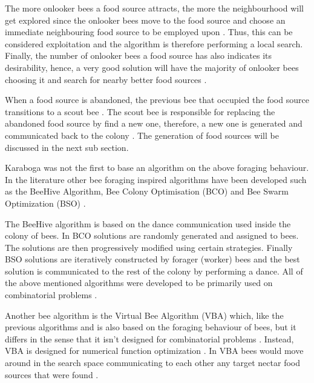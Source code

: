 The more onlooker bees a food source attracts, the more the neighbourhood will get explored since the onlooker bees move to the food source and choose an immediate neighbouring food source to be employed upon \cite{ABCCompareStudy,ABCNumericalOptimization}. Thus, this can be considered exploitation and the algorithm is therefore performing a local search. Finally, the number of onlooker bees a food source has also indicates its desirability, hence, a very good solution will have the majority of onlooker bees choosing it and search for nearby better food sources \cite{ABCCompareStudy,ABCReconfigDistro,ABCNumericalOptimization}.

When a food source is abandoned, the previous bee that occupied the food source transitions to a scout bee \cite{ABCCompareStudy,ABCNumericalOptimization}. The scout bee is responsible for replacing the abandoned food source by find a new one, therefore, a new one is generated and communicated back to the colony \cite{ABCCompareStudy,ABCImageEnhancement,ABCNumericalOptimization}. The generation of food sources will be discussed in the next sub section.

Karaboga was not the first to base an algorithm on the above foraging behaviour. In the literature other bee foraging inspired algorithms have been developed such as the BeeHive Algorithm, Bee Colony Optimisation (BCO) and Bee Swarm Optimization (BSO) \cite{BCO,HybridABCClustering,ABCNumericalOptimization}. 

The BeeHive algorithm is based on the dance communication used inside the colony of bees. In BCO solutions are randomly generated and assigned to bees\cite{HybridABCClustering,ABCNumericalOptimization}. The solutions are then progressively modified using certain strategies. Finally BSO solutions are iteratively constructed by forager (worker) bees and the best solution is communicated to the rest of the colony by performing a dance\cite{HybridABCClustering,ABCNumericalOptimization}. All of the above mentioned algorithms were developed to be primarily used on combinatorial problems \cite{ABCCompareStudy}.

Another bee algorithm is the Virtual Bee Algorithm (VBA) which, like the previous algorithms and is also based on the foraging behaviour of bees, but it differs in the sense that it isn't designed for combinatorial problems \cite{ABCNumericalOptimization}. Instead, VBA is designed for numerical function optimization \cite{ABCNumericalOptimization}. In VBA bees would move around in the search space communicating to each other any target nectar food sources that were found \cite{ABCNumericalOptimization}.

